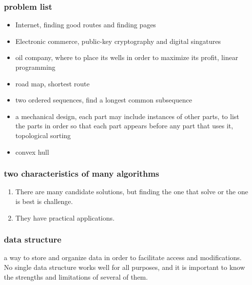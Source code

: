 \documentclass[11pt]{article}
\begin{document}
\subsubsection{problem list}
\label{sec-2-1-4}
\begin{itemize}
\item Internet, finding good routes and finding pages \\
\item Electronic commerce, public-key cryptography and digital singatures \\
\item oil company, where to place its wells in order to maximize its profit, linear programming \\
\item road map, shortest route \\
\item two ordered sequences, find a longest common subsequence \\
\item a mechanical design, each part may include instances of other parts, to list the parts in order so that each part appears before any part that uses it, topological sorting \\
\item convex hull \\
\end{itemize}

\subsubsection{two characteristics of many algorithms}
\label{sec-2-1-5}
\begin{enumerate}
\item There are many candidate solutions, but finding the one that solve or the one is best is challenge. \\
\item They have practical applications. \\
\end{enumerate}

\subsubsection{data structure}
\label{sec-2-1-6}
a way to store and organize data in order to facilitate access and modifications. \\

No single data structure works well for all purposes, and it is important to know the strengths and limitations of several of them. \\
\end{document}
